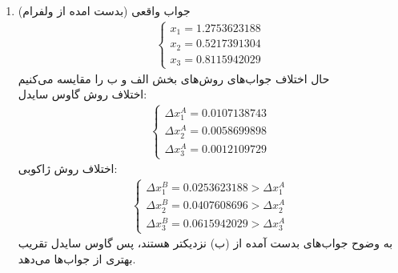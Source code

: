 {\begin{enumerate}
\begin{align*}
        &x_1 - 1(x_2) + 4x_3 = 4 \xrightarrow{(x_1, x_2) = (1,0.25)} 1 - 0.25 + 4x_3 = 4 \rightarrow x_3 = 0.8125
    \end{align*}
    دور دوم:
    \begin{align*}
        &4x_1 + 0.25 - 2(0.8125) = 4 \rightarrow x_1 = 1.34375 \\
        &-x_1 + 4x_2 - 0.8125 = 0 \xrightarrow{\text{از بالایی}} x_2 = 0.5390625 \\
        &x_1 - x_2 + 4x_3 = 4 \xrightarrow{\text{از بالایی ها}} x_3 = 0.798828125
    \end{align*}
    \newpage
    دور سوم:
    \begin{align*}
        &4x_1 + 0.5390625 - 2(0.798828125) = 4 \rightarrow x_1 = 1.2646484375 \\
        &-x_1 + 4x_2 - 0.798828125 = 0 \xrightarrow{\text{از بالایی}} x_2 = 0.5158691406 \\
        &x_1 - x_2 + 4x_3 = 4 \xrightarrow{\text{از بالایی ها}} x_3 = 0.8128051758
    \end{align*}
    \item 
    جواب‌ واقعی (بدست امده از ولفرام)
    \begin{align*}
        \begin{cases}
            x_1 = 1.2753623188 \\ 
            x_2 = 0.5217391304 \\
            x_3 = 0.8115942029
        \end{cases}
    \end{align*}
    حال اختلاف‌ جواب‌های روش‌های بخش الف و ب را مقایسه می‌کنیم
    \\
    اختلاف روش گاوس سایدل:
    \begin{align*}
        \begin{cases}
            \Delta x_1^{A} = 0.0107138743 \\
            \Delta x_2^{A} = 0.0058699898 \\
            \Delta x_3^{A} = 0.0012109729
        \end{cases}
    \end{align*}
    اختلاف روش ژاکوبی:
    \begin{align*}
        \begin{cases}
            \Delta x_1^{B} = 0.0253623188 > \Delta x_1^{A} \\
            \Delta x_2^{B} = 0.0407608696 > \Delta x_2^{A} \\
            \Delta x_3^{B} = 0.0615942029 > \Delta x_3^{A}
        \end{cases}
    \end{align*}
    به وضوح جواب‌های بدست آمده از (ب) نزدیکتر هستند، پس گاوس سایدل تقریب بهتری از جواب‌ها می‌دهد.
\end{enumerate}
}